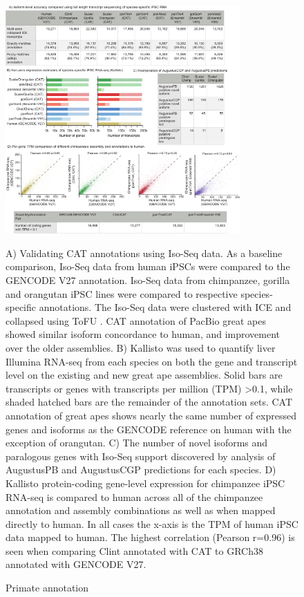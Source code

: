 \begin{figure}
\centering
\includegraphics[width=0.8\textwidth,height=0.8\textheight,keepaspectratio]{Figure_2.pdf}
\caption{Primate annotation}
A) Validating CAT annotations using Iso-Seq data. As a baseline comparison, Iso-Seq data from human iPSCs were compared to the GENCODE V27 annotation. Iso-Seq data from chimpanzee, gorilla and orangutan iPSC lines were compared to respective species-specific annotations. The Iso-Seq data were clustered with ICE and collapsed using ToFU \citep{gordon2015widespread}. CAT annotation of PacBio great apes showed similar isoform concordance to human, and improvement over the older assemblies. B) Kallisto \citep{bray2015near} was used to quantify liver Illumina RNA-seq from each species on both the gene and transcript level on the existing and new great ape assemblies. Solid bars are transcripts or genes with transcripts per million (TPM) \textgreater 0.1, while shaded hatched bars are the remainder of the annotation sets. CAT annotation of great apes shows nearly the same number of expressed genes and isoforms as the GENCODE reference on human with the exception of orangutan. C) The number of novel isoforms and paralogous genes with Iso-Seq support discovered by analysis of AugustusPB and AugustusCGP predictions for each species. D) Kallisto protein-coding gene-level expression for chimpanzee iPSC RNA-seq is compared to human across all of the chimpanzee annotation and assembly combinations as well as when mapped directly to human. In all cases the x-axis is the TPM of human iPSC data mapped to human. The highest correlation (Pearson r=0.96) is seen when comparing Clint annotated with CAT to GRCh38 annotated with GENCODE V27.
\label{fig:primate}
\end{figure}


